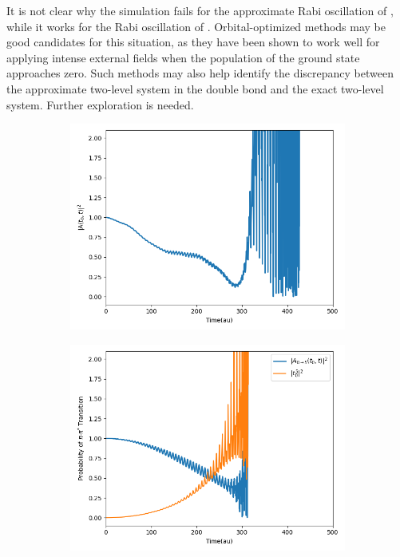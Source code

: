 It is not clear why the simulation fails for the approximate Rabi oscillation of , while it works for the Rabi oscillation of . Orbital-optimized methods may be good candidates for this situation, as they have been shown to work well for applying intense external fields when the population of the ground state approaches zero.\cite{Kristiansen2020} Such methods may also help identify the discrepancy between the approximate two-level system in the double bond and the exact two-level system. Further exploration is needed. 
\begin{figure}
     \centering
     \begin{subfigure}{0.45\textwidth}
         \centering
         \includegraphics[width=\textwidth]{ch4/Figs/9-1.png}
     \end{subfigure}
     \hfill
     \begin{subfigure}{0.45\textwidth}
         \centering
         \includegraphics[width=\textwidth]{ch4/Figs/9-2.png}

\end{subfigure}
\end{figure}
